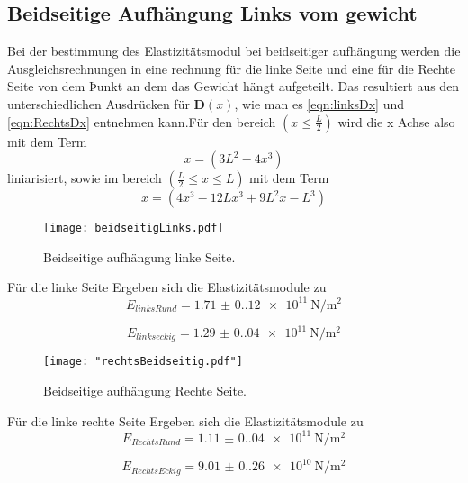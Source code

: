 \subsection{Beidseitige Aufhängung Links vom gewicht}
Bei der bestimmung des Elastizitätsmodul bei beidseitiger aufhängung werden die Ausgleichsrechnungen
in eine rechnung für die linke Seite und eine für die Rechte Seite von dem Þunkt an dem das Gewicht hängt
aufgeteilt. Das resultiert aus den unterschiedlichen Ausdrücken für $\symbf{D}(x)$, wie man es \autoref{eqn:linksDx} und 
\autoref{eqn:RechtsDx} entnehmen kann.Für den bereich $(x\leq\frac{L}{2})$ wird die x Achse also mit dem Term
\begin{equation*}
  x = (3L^2-4x^3)
\end{equation*}
liniarisiert, sowie im bereich $(\frac{L}{2}\leq x \leq L)$ mit dem Term
\begin{equation}
  x =(4x^3-12Lx^3+9L^2x-L^3)
\end{equation}


\begin{figure}[H]
  \centering
  \texttt{[image: beidseitigLinks.pdf]}
  \caption{Beidseitige aufhängung linke Seite.}
  \label{fig:linksBeidseitig}
\end{figure}
Für die linke Seite Ergeben sich die Elastizitätsmodule zu 
\begin{equation*}
  E_{linksRund} = \qty{1.71(0.12)e11}{\newton\per\meter\squared}
\end{equation*}

\begin{equation*}
  E_{linkseckig} = \qty{1.29(0.04)e11}{\newton\per\meter\squared}
\end{equation*}

\begin{figure}[H]
  \centering
  \texttt{[image: "rechtsBeidseitig.pdf"]}
  \caption{Beidseitige aufhängung Rechte Seite.}
  \label{fig:rechtsBeidseitig}
\end{figure}
Für die linke rechte Seite Ergeben sich die Elastizitätsmodule zu 
\begin{equation*}
  E_{RechtsRund} = \qty{1.11(0.04)e11}{\newton\per\meter\squared}
\end{equation*}

\begin{equation*}
  E_{RechtsEckig} = \qty{9.01(0.26)e10}{\newton\per\meter\squared}
\end{equation*}



